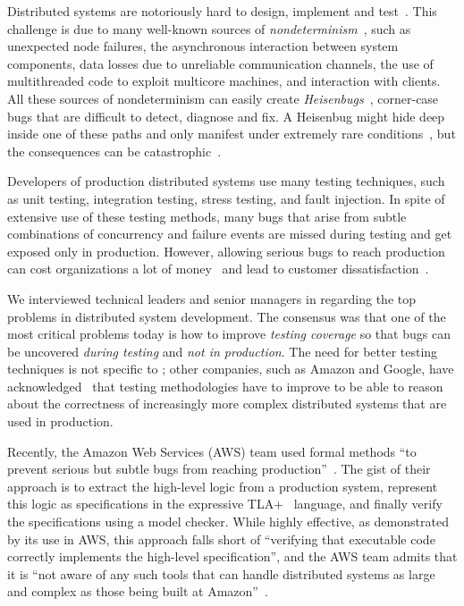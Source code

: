 Distributed systems are notoriously hard to design, implement and test~\cite{cavage2013there, leesatapornwongsa2014samc, laguna2015debugging, maddox2015test}. This challenge is due to many well-known sources of \emph{nondeterminism}~\cite{chandra2007paxos, henry2009cloud}, such as unexpected node failures, the asynchronous interaction between system components, data losses due to unreliable communication channels, the use of multithreaded code to exploit multicore machines, and interaction with clients. All these sources of nondeterminism can easily create \emph{Heisenbugs}~\cite{gray1986computers, musuvathi2008finding}, corner-case bugs that are difficult to detect, diagnose and fix. A Heisenbug might hide deep inside one of these paths and only manifest under extremely rare conditions~\cite{gray1986computers, musuvathi2008finding}, but the consequences can be catastrophic~\cite{amazon2012aws, google2014outage}.

Developers of production distributed systems use many testing techniques, such as unit testing, integration testing, stress testing, and fault injection. In spite of extensive use of these testing methods, many bugs that arise from subtle combinations of concurrency and failure events are missed during testing and get exposed only in production. However, allowing serious bugs to reach production can cost organizations a lot of money~\cite{tassey2002economic} and lead to customer dissatisfaction~\cite{amazon2012aws, google2014outage}.

We interviewed technical leaders and senior managers in \Microsoft \Azure regarding the top problems in distributed system development. The consensus was that one of the most critical problems today is how to improve \emph{testing coverage} so that bugs can be uncovered \emph{during testing} and \emph{not in production}. The need for better testing techniques is not specific to \Microsoft; other companies, such as Amazon and Google, have acknowledged~\cite{chandra2007paxos,newcombe2015aws} that testing methodologies have to improve to be able to reason about the correctness of increasingly more complex distributed systems that are used in production.

Recently, the Amazon Web Services (AWS) team used formal methods ``to prevent serious but subtle bugs from reaching production''~\cite{newcombe2015aws}. The gist of their approach is to extract the high-level logic from a production system, represent this logic as specifications in the expressive TLA+~\cite{lamport1994temporal} language, and finally verify the specifications using a model checker. While highly effective, as demonstrated by its use in AWS, this approach falls short of ``verifying that executable code correctly implements the high-level specification'', and the AWS team admits that it is ``not aware of any such tools that can handle distributed systems as large and complex as those being built at Amazon''~\cite{newcombe2015aws}.

